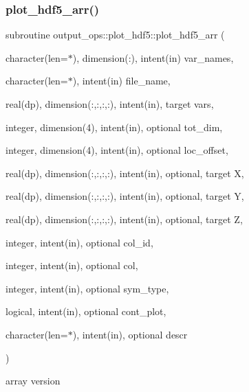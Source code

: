 \subsubsection{\texorpdfstring{plot\+\_\+hdf5\+\_\+arr()}{plot\_hdf5\_arr()}}
{\footnotesize\ttfamily subroutine output\+\_\+ops\+::plot\+\_\+hdf5\+::plot\+\_\+hdf5\+\_\+arr (\begin{DoxyParamCaption}\item[{character(len=$\ast$), dimension(\+:), intent(in)}]{var\+\_\+names,  }\item[{character(len=$\ast$), intent(in)}]{file\+\_\+name,  }\item[{real(dp), dimension(\+:,\+:,\+:,\+:), intent(in), target}]{vars,  }\item[{integer, dimension(4), intent(in), optional}]{tot\+\_\+dim,  }\item[{integer, dimension(4), intent(in), optional}]{loc\+\_\+offset,  }\item[{real(dp), dimension(\+:,\+:,\+:,\+:), intent(in), optional, target}]{X,  }\item[{real(dp), dimension(\+:,\+:,\+:,\+:), intent(in), optional, target}]{Y,  }\item[{real(dp), dimension(\+:,\+:,\+:,\+:), intent(in), optional, target}]{Z,  }\item[{integer, intent(in), optional}]{col\+\_\+id,  }\item[{integer, intent(in), optional}]{col,  }\item[{integer, intent(in), optional}]{sym\+\_\+type,  }\item[{logical, intent(in), optional}]{cont\+\_\+plot,  }\item[{character(len=$\ast$), intent(in), optional}]{descr }\end{DoxyParamCaption})}



array version 


